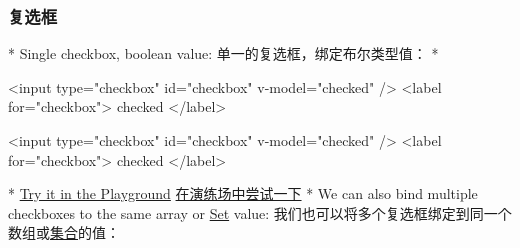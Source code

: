 \begin{paracol}{2}
\subsubsection{复选框}
\switchcolumn[0]*%
Single checkbox, boolean value:
\switchcolumn
单一的复选框，绑定布尔类型值：
\switchcolumn[0]*%
\begin{codeHtml}
<input type="checkbox" id="checkbox" v-model="checked" />
<label for="checkbox">{{ checked }}</label>
\end{codeHtml}
\switchcolumn
\begin{codeHtml}
<input type="checkbox" id="checkbox" v-model="checked" />
<label for="checkbox">{{ checked }}</label>
\end{codeHtml}
\switchcolumn[0]*%
\href{https://play.vuejs.org/\#eNpVjssKgzAURH/lko3tonVfotD/yEaTKw3Ni3gjLSH/3qhUcDnDnMNk9gzhviRkD8ZnGXUgmJFS6IXTNvhIkCHiBAWm6C00ddoIJ5z0biaQL5RvVNCtmwvFhFfheLuLqqIGQhvMQLgm4tqFREDfgJ1gGz36j2Cg1TkvN+sVmn+JqnbtrjDDiAYmH09En/PxphTebqsK8PY4wMoPslBUxQ==}{Try
it in the Playground}
\switchcolumn
\href{https://play.vuejs.org/\#eNpVjssKgzAURH/lko3tonVfotD/yEaTKw3Ni3gjLSH/3qhUcDnDnMNk9gzhviRkD8ZnGXUgmJFS6IXTNvhIkCHiBAWm6C00ddoIJ5z0biaQL5RvVNCtmwvFhFfheLuLqqIGQhvMQLgm4tqFREDfgJ1gGz36j2Cg1TkvN+sVmn+JqnbtrjDDiAYmH09En/PxphTebqsK8PY4wMoPslBUxQ==}{在演练场中尝试一下}
\switchcolumn[0]*%
We can also bind multiple checkboxes to the same array or
\href{https://developer.mozilla.org/en-US/docs/Web/JavaScript/Reference/Global_Objects/Set}{Set}
value:
\switchcolumn
我们也可以将多个复选框绑定到同一个数组或\href{https://developer.mozilla.org/en-US/docs/Web/JavaScript/Reference/Global_Objects/Set}{集合}的值：



\end{paracol}
